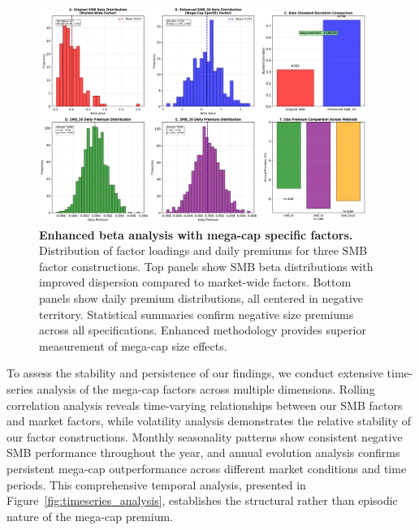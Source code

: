 \documentclass[10pt,letterpaper]{article}
\begin{document}
\begin{figure}[!h]
\centering
\includegraphics[width=0.95\textwidth]{figures/fig_enhanced_beta_analysis.pdf}
\caption{\textbf{Enhanced beta analysis with mega-cap specific factors.}
Distribution of factor loadings and daily premiums for three SMB factor constructions. Top panels show SMB beta distributions with improved dispersion compared to market-wide factors. Bottom panels show daily premium distributions, all centered in negative territory. Statistical summaries confirm negative size premiums across all specifications. Enhanced methodology provides superior measurement of mega-cap size effects.}
\label{fig:enhanced_beta}
\end{figure}

To assess the stability and persistence of our findings, we conduct extensive time-series analysis of the mega-cap factors across multiple dimensions. Rolling correlation analysis reveals time-varying relationships between our SMB factors and market factors, while volatility analysis demonstrates the relative stability of our factor constructions. Monthly seasonality patterns show consistent negative SMB performance throughout the year, and annual evolution analysis confirms persistent mega-cap outperformance across different market conditions and time periods. This comprehensive temporal analysis, presented in Figure~\ref{fig:timeseries_analysis}, establishes the structural rather than episodic nature of the mega-cap premium.
\end{document}
